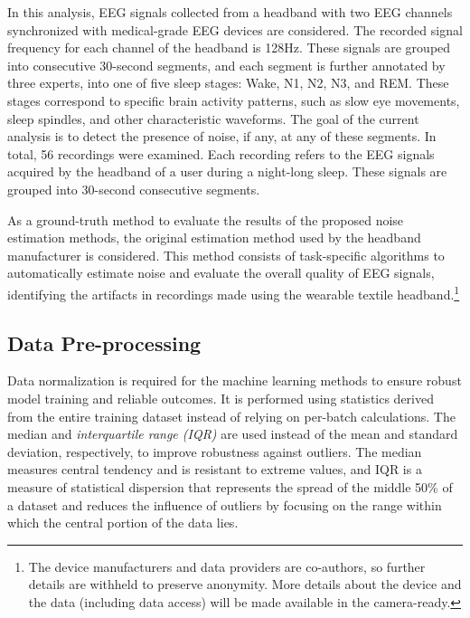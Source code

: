 \documentclass[runningheads]{llncs}
\begin{document}
In this analysis, EEG signals collected from a headband with two EEG
channels synchronized with medical-grade EEG devices are
considered. The recorded signal frequency for each channel of the
headband is 128Hz. These signals are grouped into consecutive
30-second segments, and each segment is further annotated by three
experts, into one of five sleep stages: Wake, N1, N2, N3, and
REM. These stages correspond to specific brain activity patterns, such
as slow eye movements, sleep spindles, and other characteristic
waveforms. The goal of the current analysis is to detect the presence
of noise, if any, at any of these segments. In total, 56 recordings
were examined. Each recording refers to the EEG signals acquired by
the headband of a user during a night-long sleep. These signals are
grouped into 30-second consecutive segments.

As a ground-truth method to evaluate the results of the proposed noise
estimation methods, the original estimation method used by the
headband manufacturer is considered. This method consists of
task-specific algorithms to automatically estimate noise and evaluate
the overall quality of EEG signals, identifying the artifacts in
recordings made using the wearable textile headband.\footnote{The
  device manufacturers and data providers are co-authors, so further
  details are withheld to preserve anonymity. More details about the
  device and the data (including data access) will be made available in
  the camera-ready.}


\subsection{Data Pre-processing}

Data normalization is required for the machine learning methods to
ensure robust model training and reliable outcomes. It is performed
using statistics derived from the entire training dataset instead of
relying on per-batch calculations. The median and
\emph{interquartile range (IQR)} are used instead of the mean and
standard deviation, respectively, to improve robustness against
outliers. The median measures central tendency and is resistant to
extreme values, and IQR is a measure of statistical dispersion that
represents the spread of the middle 50\% of a dataset and reduces the
influence of outliers by focusing on the range within which the
central portion of the data lies.

\end{document}
